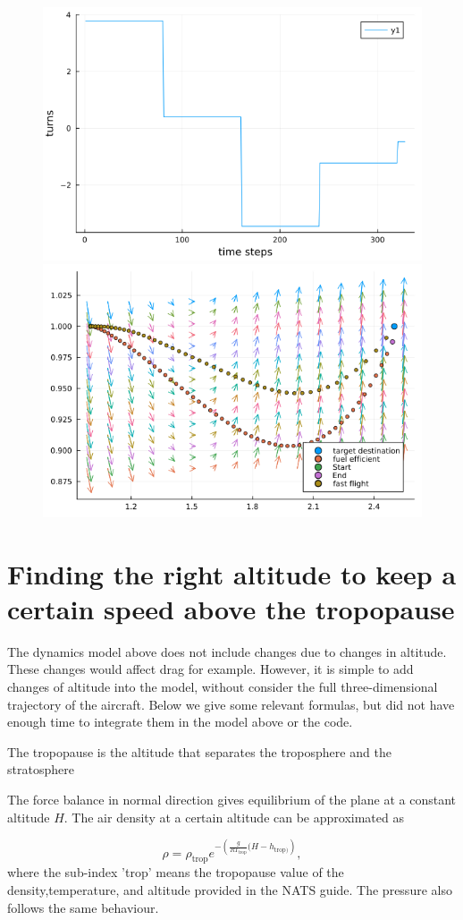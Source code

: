 \documentclass{article}
\begin{document}
\begin{figure}
    \centering
    \includegraphics[width = 0.49\linewidth]{../imgs/readme-4.png}
    \includegraphics[width = 0.49\linewidth]{../imgs/readme-5.png}
\end{figure}

\section{Finding the right altitude to keep a certain speed above the tropopause}

The dynamics model above does not include changes due to changes in altitude. These changes would affect drag for example. However, it is simple to add changes of altitude into the model, without consider the full three-dimensional trajectory of the aircraft. Below we give some relevant formulas, but did not have enough time to integrate them in the model above or the code.  

The tropopause is the altitude that separates the troposphere and the stratosphere 

The force balance in normal direction gives equilibrium of the plane at a constant altitude $H$. 
The air density at a certain altitude can be approximated as

\begin{equation}
    \rho= \rho_{\text{trop}}e^{-\left( \frac{g}{RT_{\text{trop}}}(H-h_{\text{trop})} \right)},
\end{equation}
where the sub-index 'trop' means the tropopause value of the density,temperature, and altitude provided in the NATS guide. The pressure also follows the same behaviour.
\end{document}
